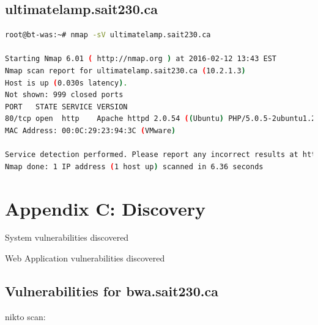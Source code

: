 \documentclass{article}
\begin{document}
\subsection{ultimatelamp.sait230.ca}

\begin{lstlisting}[language=bash]
root@bt-was:~# nmap -sV ultimatelamp.sait230.ca

Starting Nmap 6.01 ( http://nmap.org ) at 2016-02-12 13:43 EST
Nmap scan report for ultimatelamp.sait230.ca (10.2.1.3)
Host is up (0.030s latency).
Not shown: 999 closed ports
PORT   STATE SERVICE VERSION
80/tcp open  http    Apache httpd 2.0.54 ((Ubuntu) PHP/5.0.5-2ubuntu1.2)
MAC Address: 00:0C:29:23:94:3C (VMware)

Service detection performed. Please report any incorrect results at http://nmap.org/submit/ .
Nmap done: 1 IP address (1 host up) scanned in 6.36 seconds
\end{lstlisting}

\newpage
\section{Appendix C: Discovery}

System vulnerabilities discovered


Web Application vulnerabilities discovered


\newpage
\subsection{Vulnerabilities for bwa.sait230.ca}

nikto scan:
\end{document}
